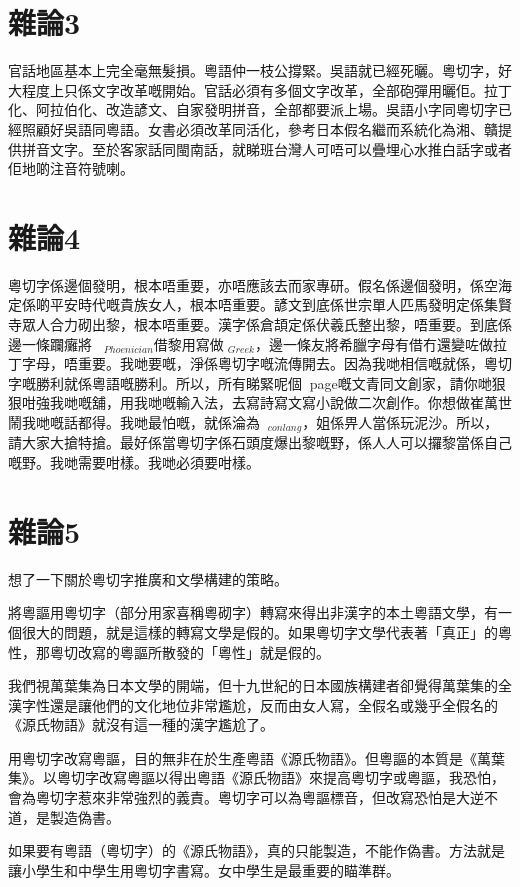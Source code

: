 \documentclass[a5paper, 10pt, openany]{book} %
\begin{document}
\chapter{雜論3}
官話地區基本上完全毫無髮損。粵語仲一枝公撐緊。吳語就已經死曬。粵切字，好大程度上只係文字改革嘅開始。官話必須有多個文字改革，全部砲彈用曬佢。拉丁化、阿拉伯化、改造諺文、自家發明拼音，全部都要派上場。吳語小字同粵切字已經照顧好吳語同粵語。女書必須改革同活化，參考日本假名繼而系統化為湘、贛提供拼音文字。至於客家話同閩南話，就睇班台灣人可唔可以疊埋心水推白話字或者佢地啲注音符號喇。

\chapter{雜論4}
粵切字係邊個發明，根本唔重要，亦唔應該去而家專研。假名係邊個發明，係空海定係啲平安時代嘅貴族女人，根本唔重要。諺文到底係世宗單人匹馬發明定係集賢寺眾人合力砌出黎，根本唔重要。漢字係倉頡定係伏羲氏整出黎，唔重要。到底係邊一條躝癱將$_{Phoenician}$借黎用寫做$_{Greek}$，邊一條友將希臘字母有借冇還變咗做拉丁字母，唔重要。我哋要嘅，淨係粵切字嘅流傳開去。因為我哋相信嘅就係，粵切字嘅勝利就係粵語嘅勝利。所以，所有睇緊呢個page嘅文青同文創家，請你哋狠狠咁強我哋嘅舖，用我哋嘅輸入法，去寫詩寫文寫小說做二次創作。你想做崔萬世鬧我哋嘅話都得。我哋最怕嘅，就係淪為$_{con lang}$，姐係畀人當係玩泥沙。所以，請大家大搶特搶。最好係當粵切字係石頭度爆出黎嘅野，係人人可以攞黎當係自己嘅野。我哋需要咁樣。我哋必須要咁樣。



\chapter{雜論5}
想了一下關於粵切字推廣和文學構建的策略。

將粵謳用粵切字（部分用家喜稱粵砌字）轉寫來得出非漢字的本土粵語文學，有一個很大的問題，就是這樣的轉寫文學是假的。如果粵切字文學代表著「真正」的粵性，那粵切改寫的粵謳所散發的「粵性」就是假的。

我們視萬葉集為日本文學的開端，但十九世紀的日本國族構建者卻覺得萬葉集的全漢字性還是讓他們的文化地位非常尷尬，反而由女人寫，全假名或幾乎全假名的《源氏物語》就沒有這一種的漢字尷尬了。

用粵切字改寫粵謳，目的無非在於生產粵語《源氏物語》。但粵謳的本質是《萬葉集》。以粵切字改寫粵謳以得出粵語《源氏物語》來提高粵切字或粵謳，我恐怕，會為粵切字惹來非常強烈的義責。粵切字可以為粵謳標音，但改寫恐怕是大逆不道，是製造偽書。

如果要有粵語（粵切字）的《源氏物語》，真的只能製造，不能作偽書。方法就是讓小學生和中學生用粵切字書寫。女中學生是最重要的瞄準群。
\end{document}
